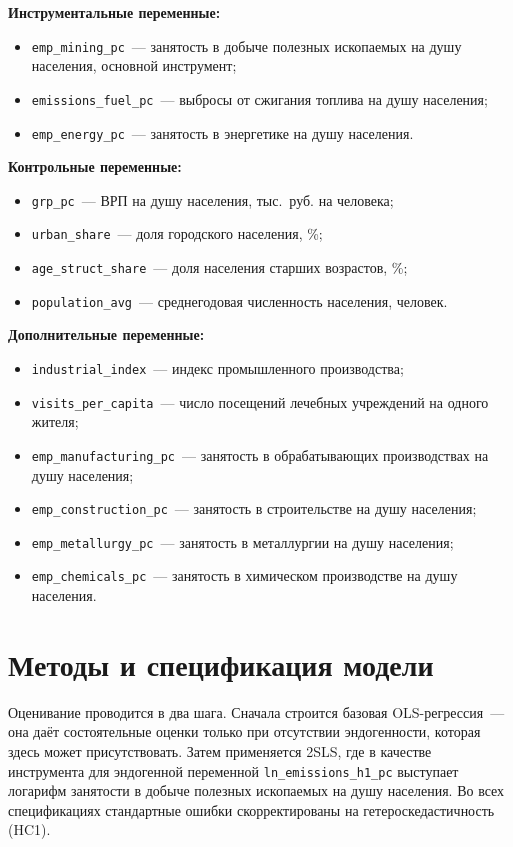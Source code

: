 \documentclass[11pt,a4paper]{article}
\begin{document}
\textbf{Инструментальные переменные:}
\begin{itemize}
  \item \texttt{emp\_mining\_pc}~--- занятость в добыче полезных ископаемых на душу населения, основной инструмент;
  \item \texttt{emissions\_fuel\_pc}~--- выбросы от сжигания топлива на душу населения;
  \item \texttt{emp\_energy\_pc}~--- занятость в энергетике на душу населения.
\end{itemize}

\textbf{Контрольные переменные:}
\begin{itemize}
  \item \texttt{grp\_pc}~--- ВРП на душу населения, тыс.~руб. на человека;
  \item \texttt{urban\_share}~--- доля городского населения, \%;
  \item \texttt{age\_struct\_share}~--- доля населения старших возрастов, \%;
  \item \texttt{population\_avg}~--- среднегодовая численность населения, человек.
\end{itemize}

\textbf{Дополнительные переменные:}
\begin{itemize}
  \item \texttt{industrial\_index}~--- индекс промышленного производства;
  \item \texttt{visits\_per\_capita}~--- число посещений лечебных учреждений на одного жителя;
  \item \texttt{emp\_manufacturing\_pc}~--- занятость в обрабатывающих производствах на душу населения;
  \item \texttt{emp\_construction\_pc}~--- занятость в строительстве на душу населения;
  \item \texttt{emp\_metallurgy\_pc}~--- занятость в металлургии на душу населения;
  \item \texttt{emp\_chemicals\_pc}~--- занятость в химическом производстве на душу населения.
\end{itemize}

\section*{Методы и спецификация модели}

Оценивание проводится в два шага. Сначала строится базовая OLS-регрессия~--- она даёт состоятельные оценки только при отсутствии эндогенности, которая здесь может присутствовать. Затем применяется 2SLS, где в качестве инструмента для эндогенной переменной \texttt{ln\_emissions\_h1\_pc} выступает логарифм занятости в добыче полезных ископаемых на душу населения. Во всех спецификациях стандартные ошибки скорректированы на гетероскедастичность (HC1).
\end{document}
